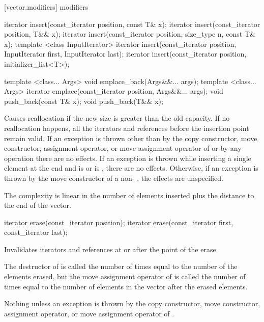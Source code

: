 [vector.modifiers]{ modifiers}

%
\begin{itemdecl}
iterator insert(const_iterator position, const T& x);
iterator insert(const_iterator position, T&& x);
iterator insert(const_iterator position, size_type n, const T& x);
template <class InputIterator>
  iterator insert(const_iterator position, InputIterator first, InputIterator last);
iterator insert(const_iterator position, initializer_list<T>);

template <class... Args> void emplace_back(Args&&... args);
template <class... Args> iterator emplace(const_iterator position, Args&&... args);
void push_back(const T& x);
void push_back(T&& x);
\end{itemdecl}

\begin{itemdescr}
\pnum
\notes
Causes reallocation if the new size is greater than the old capacity.
If no reallocation happens, all the iterators and references before the insertion point remain valid.
If an exception is thrown other than by
the copy constructor, move constructor,
assignment operator, or move assignment operator of
 or by any  operation
there are no effects.
If an exception is thrown while inserting a single element at the end and
 is  or 
is , there are no effects.
Otherwise, if an exception is thrown by the move constructor of a non-
, the effects are unspecified.

\pnum
\complexity
The complexity is linear in the number of elements inserted plus the distance
to the end of the vector.
\end{itemdescr}

%
\begin{itemdecl}
iterator erase(const_iterator position);
iterator erase(const_iterator first, const_iterator last);
\end{itemdecl}

\begin{itemdescr}
\pnum
\effects
Invalidates iterators and references at or after the point of the erase.

\pnum
\complexity
The destructor of  is called the number of times equal to the
number of the elements erased, but the move assignment operator
of  is called the number of times equal to the number of
elements in the vector after the erased elements.

\pnum
\throws
Nothing unless an exception is thrown by the
copy constructor, move constructor,
assignment operator, or move assignment operator of
.
\end{itemdescr}

